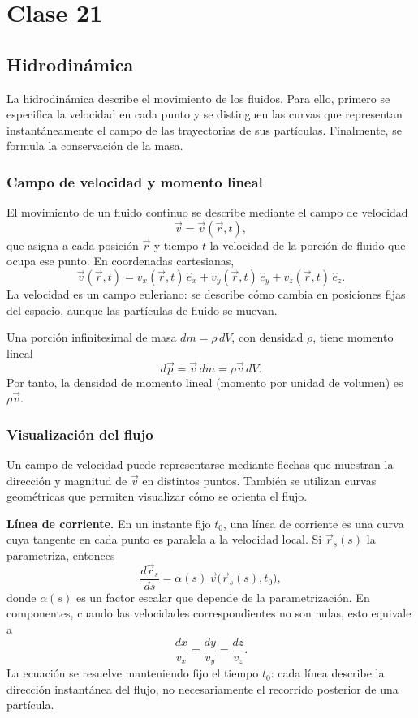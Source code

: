 \chapter{Clase 21}

\section{Hidrodinámica}

La hidrodinámica describe el movimiento de los fluidos. Para ello, primero se especifica la velocidad en cada punto y se distinguen las curvas que representan instantáneamente el campo de las trayectorias de sus partículas. Finalmente, se formula la conservación de la masa.

\subsection{Campo de velocidad y momento lineal}

El movimiento de un fluido continuo se describe mediante el campo de velocidad
\[
\vec v=\vec v(\vec r,t),
\]
que asigna a cada posición $\vec r$ y tiempo $t$ la velocidad de la porción de fluido que ocupa ese punto. En coordenadas cartesianas,
\[
\vec v(\vec r,t)=v_x(\vec r,t)\,\hat e_x+v_y(\vec r,t)\,\hat e_y+v_z(\vec r,t)\,\hat e_z.
\]
La velocidad es un campo euleriano: se describe cómo cambia en posiciones fijas del espacio, aunque las partículas de fluido se muevan.

Una porción infinitesimal de masa $dm=\rho\,dV$, con densidad $\rho$, tiene momento lineal
\[
d\vec p=\vec v\,dm=\rho\vec v\,dV.
\]
Por tanto, la densidad de momento lineal (momento por unidad de volumen) es $\rho\vec v$.

\subsection{Visualización del flujo}

Un campo de velocidad puede representarse mediante flechas que muestran la dirección y magnitud de $\vec v$ en distintos puntos. También se utilizan curvas geométricas que permiten visualizar cómo se orienta el flujo.

\textbf{Línea de corriente.} En un instante fijo $t_0$, una línea de corriente es una curva cuya tangente en cada punto es paralela a la velocidad local. Si $\vec r_s(s)$ la parametriza, entonces
\[
\frac{d\vec r_s}{ds}=\alpha(s)\,\vec v\bigl(\vec r_s(s),t_0\bigr),
\]
donde $\alpha(s)$ es un factor escalar que depende de la parametrización. En componentes, cuando las velocidades correspondientes no son nulas, esto equivale a
\[
\frac{dx}{v_x}=\frac{dy}{v_y}=\frac{dz}{v_z}.
\]
La ecuación se resuelve manteniendo fijo el tiempo $t_0$: cada línea describe la dirección instantánea del flujo, no necesariamente el recorrido posterior de una partícula.

